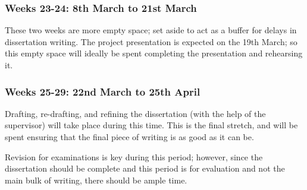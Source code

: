 \documentclass[12pt, a4paper]{scrartcl}
\begin{document}
\subsubsection{Weeks 23-24: 8th March to 21st March}

These two weeks are more empty space; set aside to act as a buffer for delays in dissertation writing. The project presentation is expected on the 19th March; so this empty space will ideally be spent completing the presentation and rehearsing it.

\subsubsection{Weeks 25-29: 22nd March to 25th April}

Drafting, re-drafting, and refining the dissertation (with the help of the supervisor) will take place during this time. This is the final stretch, and will be spent ensuring that the final piece of writing is as good as it can be.

Revision for examinations is key during this period; however, since the dissertation should be complete and this period is for evaluation and not the main bulk of writing, there should be ample time.




\end{document}
